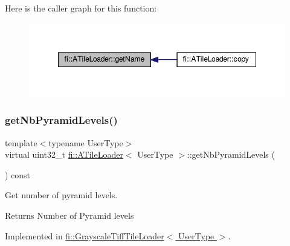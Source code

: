 Here is the caller graph for this function\+:
\nopagebreak
\begin{figure}[H]
\begin{center}
\leavevmode
\includegraphics[width=348pt]{dc/d54/classfi_1_1ATileLoader_abb4cad235d57fbfb29ff5d37caf32a62_icgraph}
\end{center}
\end{figure}
\mbox{\label{classfi_1_1ATileLoader_ad6550495be22454b5f72d46c68622c37}} 
\subsubsection{\texorpdfstring{get\+Nb\+Pyramid\+Levels()}{getNbPyramidLevels()}}
{\footnotesize\ttfamily template$<$typename User\+Type$>$ \\
virtual uint32\+\_\+t \hyperlink{classfi_1_1ATileLoader}{fi\+::\+A\+Tile\+Loader}$<$ User\+Type $>$\+::get\+Nb\+Pyramid\+Levels (\begin{DoxyParamCaption}{ }\end{DoxyParamCaption}) const\hspace{0.3cm}{\ttfamily [pure virtual]}}



Get number of pyramid levels. 

\begin{DoxyReturn}{Returns}
Number of Pyramid levels 
\end{DoxyReturn}


Implemented in \hyperlink{classfi_1_1GrayscaleTiffTileLoader_a3a915d36a8c88a687b04ee8d5a15ecb0}{fi\+::\+Grayscale\+Tiff\+Tile\+Loader$<$ User\+Type $>$}.

